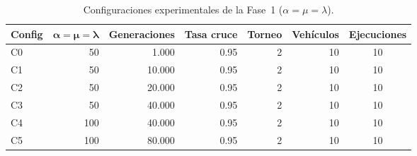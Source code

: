 
\begin{table}[H]
    \centering
    \caption{Configuraciones experimentales de la Fase~1 ($\alpha = \mu = \lambda$).}
    \label{tab:configs_fase1}
    \begin{tabular}{lrrrrrc}
        \toprule
        \textbf{Config} & $\boldsymbol{\alpha=\mu=\lambda}$ & \textbf{Generaciones}
            & \textbf{Tasa cruce} & \textbf{Torneo} & \textbf{Vehículos} & \textbf{Ejecuciones} \\
        \midrule
        C0 & 50 & 1.000 & 0.95 & 2 & 10 & 10 \\
        C1 & 50 & 10.000 & 0.95 & 2 & 10 & 10 \\
        C2 & 50 & 20.000 & 0.95 & 2 & 10 & 10 \\
        C3 & 50 & 40.000 & 0.95 & 2 & 10 & 10 \\
        C4 & 100 & 40.000 & 0.95 & 2 & 10 & 10 \\
        C5 & 100 & 80.000 & 0.95 & 2 & 10 & 10 \\
        \bottomrule
    \end{tabular}
\end{table}
